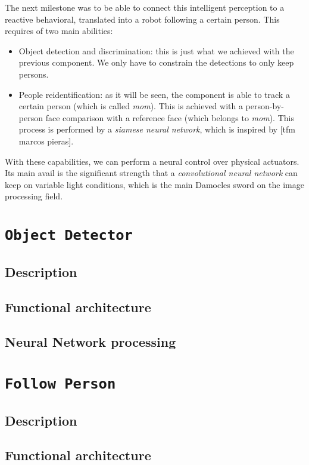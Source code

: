 The next milestone was to be able to connect this intelligent perception to a reactive behavioral, translated into a robot following a certain person. This requires of two main abilities:
\begin{itemize}
	\item Object detection and discrimination: this is just what we achieved with the previous component. We only have to constrain the detections to only keep persons.
	\item People reidentification: as it will be seen, the component is able to track a certain person (which is called \emph{mom}). This is achieved with a person-by-person face comparison with a reference face (which belongs to \emph{mom}). This process is performed by a \emph{siamese neural network}, which is inspired by [tfm marcos pieras].
\end{itemize}

With these capabilities, we can perform a neural control over physical actuators. Its main avail is the significant strength that a \emph{convolutional neural network} can keep on variable light conditions, which is the main Damocles sword on the image processing field.



\chapter{\texttt{Object Detector}}
\section{Description}
\section{Functional architecture}
\section{Neural Network processing}


\chapter{\texttt{Follow Person}}
\section{Description}
\section{Functional architecture}
